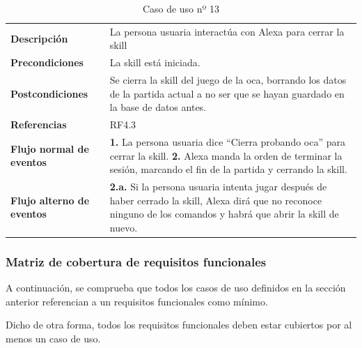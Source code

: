 \begin{table}[H]
	\centering
	\begin{tabular}{|p{3cm}|p{12cm}|}
		\hline
		\rowcolor{lightgray}
		\multicolumn{2}{|c|}{\textbf{CU13}: Cerrar la skill} \\
		\hline
		\textbf{Descripción} & La persona usuaria interactúa con Alexa para cerrar la skill \vspace{0.2cm} \\
		\hline
		\textbf{Precondiciones} & La skill está iniciada. \vspace{0.2cm} \\
		\hline
		\textbf{Postcondiciones} & Se cierra la skill del juego de la oca, borrando los datos de la partida actual a no ser que se hayan guardado en la base de datos antes. \vspace{0.2cm} \\
		\hline
		\textbf{Referencias} & RF4.3 \vspace{0.2cm} \\
		\hline
		\textbf{Flujo normal de eventos} &
		\textbf{1.} La persona usuaria dice \enquote{Cierra probando oca} para cerrar la skill. \newline
		\vspace{0.2cm}
		\textbf{2.} Alexa manda la orden de terminar la sesión, marcando el fin de la partida y cerrando la skill.
		\vspace{0.2cm} \\
		\hline
		\textbf{Flujo alterno de eventos} &
		\textbf{2.a.} Si la persona usuaria intenta jugar después de haber cerrado la skill, Alexa dirá que no reconoce ninguno de los comandos y habrá que abrir la skill de nuevo. \vspace{0.2cm} \\
		\hline
	\end{tabular}
	\caption{Caso de uso nº 13}
	\label{tab:CU13}
\end{table}

\newpage
\subsubsection{Matriz de cobertura de requisitos funcionales}

A continuación, se comprueba que todos los casos de uso definidos en la sección anterior referencian a un requisitos funcionales como mínimo. 

Dicho de otra forma, todos los requisitos funcionales deben estar cubiertos por al menos un caso de uso.

